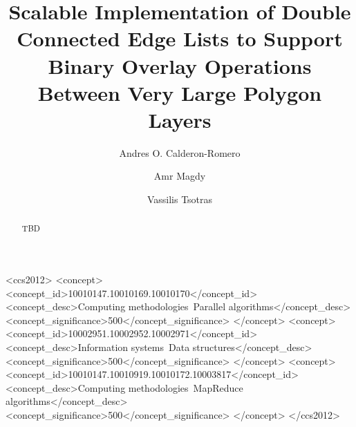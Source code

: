 \documentclass[sigconf]{acmart}
\begin{document}
\title[Scalable Implementation of a DCEL to Support Overlay Operations]{Scalable Implementation of Double Connected Edge Lists to Support Binary Overlay Operations Between Very Large Polygon Layers}

\author{Andres O. Calderon-Romero}
\author{Amr Magdy}
\author{Vassilis Tsotras}


\renewcommand{\shortauthors}{Calderon, et al.}

\begin{abstract}
    TBD
\end{abstract}

\begin{CCSXML}
<ccs2012>
   <concept>
       <concept_id>10010147.10010169.10010170</concept_id>
       <concept_desc>Computing methodologies~Parallel algorithms</concept_desc>
       <concept_significance>500</concept_significance>
       </concept>
   <concept>
       <concept_id>10002951.10002952.10002971</concept_id>
       <concept_desc>Information systems~Data structures</concept_desc>
       <concept_significance>500</concept_significance>
       </concept>
   <concept>
       <concept_id>10010147.10010919.10010172.10003817</concept_id>
       <concept_desc>Computing methodologies~MapReduce algorithms</concept_desc>
       <concept_significance>500</concept_significance>
       </concept>
 </ccs2012>
\end{CCSXML}
\end{document}
